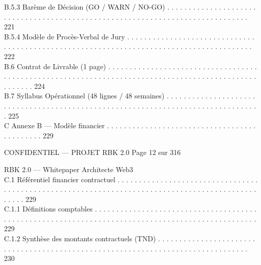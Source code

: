 B.5.3              Barème de Décision (GO / WARN / NO-GO) . . . . . . . . . . . . . . . . . . . . . . . . . . . . . . . . . . . . . . . . . . . . . . . . . . . . . . . . . . . . . . . . . . . . . . . . . . . . . . 221\\
B.5.4              Modèle de Procès-Verbal de Jury . . . . . . . . . . . . . . . . . . . . . . . . . . . . . . . . . . . . . . . . . . . . . . . . . . . . . . . . . . . . . . . . . . . . . . . . . . . . . . . . . . . . . . . . 222\\
B.6     Contrat de Livrable (1 page) . . . . . . . . . . . . . . . . . . . . . . . . . . . . . . . . . . . . . . . . . . . . . . . . . . . . . . . . . . . . . . . . . . . . . . . . . . . . . . . . . . . . . . . . . . . . . . . . . . . . . 224\\
B.7     Syllabus Opérationnel (48 lignes / 48 semaines) . . . . . . . . . . . . . . . . . . . . . . . . . . . . . . . . . . . . . . . . . . . . . . . . . . . . . . . . . . . . . . . . . . . . . . . . . . . . . . . . . 225\\
\vspace{0.5em}
C     Annexe B — Modèle financier . . . . . . . . . . . . . . . . . . . . . . . . . . . . . . . . . . . . . . . . . . . . 229\\
\vspace{0.5em}
\vspace{0.5em}
\begin{confidential}CONFIDENTIEL — PROJET RBK 2.0                                                                           Page 12 sur 316\end{confidential}
RBK 2.0 — Whitepaper Architecte Web3\\
\vspace{0.5em}
\vspace{0.5em}
C.1     Référentiel financier contractuel . . . . . . . . . . . . . . . . . . . . . . . . . . . . . . . . . . . . . . . . . . . . . . . . . . . . . . . . . . . . . . . . . . . . . . . . . . . . . . . . . . . . . . . . . . . . . . . . . 229\\
C.1.1               Définitions comptables . . . . . . . . . . . . . . . . . . . . . . . . . . . . . . . . . . . . . . . . . . . . . . . . . . . . . . . . . . . . . . . . . . . . . . . . . . . . . . . . . . . . . . . . . . . . . . . . . 229\\
C.1.2               Synthèse des montants contractuels (TND) . . . . . . . . . . . . . . . . . . . . . . . . . . . . . . . . . . . . . . . . . . . . . . . . . . . . . . . . . . . . . . . . . . . . . . . . . . . . . . . . 230\\
